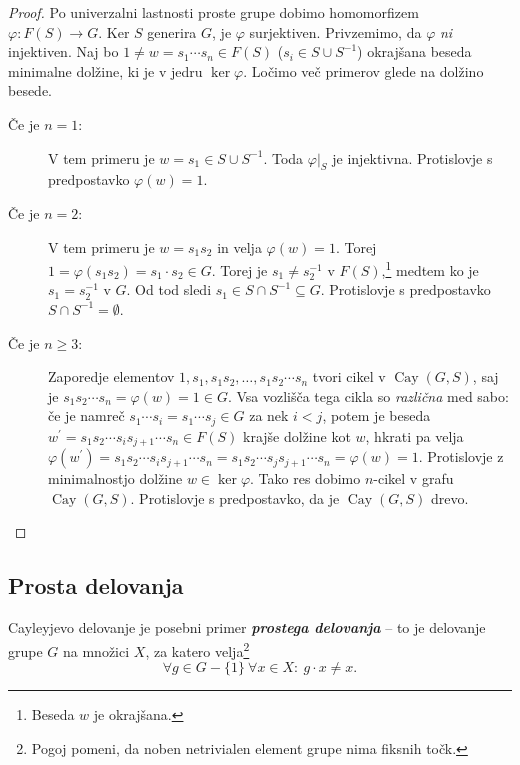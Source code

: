 \documentclass[11pt]{book}
\DeclareMathOperator\Cay{Cay}
\def\definicija{\color{rdeca}\bf\em}
\theoremstyle{definition}
\theoremstyle{zgled}
\theoremstyle{odprtproblem}
\theoremstyle{domacanaloga}
\newenvironment{dokaz}
    {\color{siva}\begin{proof}}
    {\end{proof}}
\theoremstyle{izrek}
\begin{document}
\begin{dokaz}
Po univerzalni lastnosti proste grupe dobimo homomorfizem $\varphi \colon F(S) \to G$. Ker $S$ generira $G$, je $\varphi$ surjektiven. Privzemimo, da $\varphi$ {\em ni} injektiven. Naj bo $1 \neq w = s_1 \cdots s_n \in F(S)$ ($s_i \in S \cup S^{-1}$) okrajšana beseda minimalne dolžine, ki je v jedru $\ker \varphi$. Ločimo več primerov glede na dolžino besede.

\begin{description}
    \item[Če je $n = 1$:] V tem primeru je $w = s_1 \in S \cup S^{-1}$. Toda $\varphi|_{S}$ je injektivna. Protislovje s predpostavko $\varphi(w) = 1$.

    \item[Če je $n = 2$:] V tem primeru je $w = s_1 s_2$ in velja $\varphi(w) = 1$. Torej $1 = \varphi(s_1 s_2) = s_1 \cdot s_2 \in G$. Torej je $s_1 \neq s_2^{-1}$ v $F(S)$,\footnote{Beseda $w$ je okrajšana.} medtem ko je $s_1 = s_2^{-1}$ v $G$. Od tod sledi $s_1 \in S \cap S^{-1} \subseteq G$. Protislovje s predpostavko $S \cap S^{-1} = \emptyset$.

    \item[Če je $n \geq 3$:] Zaporedje elementov $1, s_1, s_1 s_2, \dots, s_1 s_2 \cdots s_n$ tvori cikel v $\Cay(G,S)$, saj je $s_1 s_2 \cdots s_n = \varphi(w) = 1 \in G$. Vsa vozlišča tega cikla so {\em različna} med sabo: če je namreč $s_1 \cdots s_i = s_1 \cdots s_j \in G$ za nek $i < j$, potem je beseda $w^\prime = s_1 s_2 \cdots s_i s_{j+1} \cdots s_n \in F(S)$ krajše dolžine kot $w$, hkrati pa velja $\varphi(w^\prime) = s_1 s_2 \cdots s_i s_{j+1} \cdots s_n = s_1 s_2 \cdots s_j s_{j+1} \cdots s_n = \varphi(w) = 1$. Protislovje z minimalnostjo dolžine $w \in \ker \varphi$. Tako res dobimo $n$-cikel v grafu $\Cay(G,S)$. Protislovje s predpostavko, da je $\Cay(G,S)$ drevo.
\end{description}
\end{dokaz}

\subsection{Prosta delovanja}

Cayleyjevo delovanje je posebni primer {\definicija prostega delovanja} -- to je delovanje grupe $G$ na množici $X$, za katero velja\footnote{Pogoj pomeni, da noben netrivialen element grupe nima fiksnih točk.}
\[
\forall g \in G - \{ 1 \} \ \forall x \in X \colon \ g \cdot x \neq x.
\]
\end{document}

